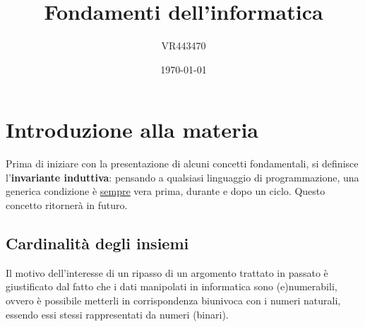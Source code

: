 \documentclass[a4paper]{article}
\begin{document}
	\author{VR443470}
	\title{Fondamenti dell'informatica}
	\date{\printdayoff\today}
	\maketitle
	
	\newpage
	
	\tableofcontents
	
	\newpage
	
	\section{Introduzione alla materia}
	
	Prima di iniziare con la presentazione di alcuni concetti fondamentali, si definisce l'\textbf{invariante induttiva}: pensando a qualsiasi linguaggio di programmazione, una generica condizione è \underline{sempre} vera prima, durante e dopo un ciclo. Questo concetto ritornerà in futuro.
	
	\subsection{Cardinalità degli insiemi}
	Il motivo dell'interesse di un ripasso di un argomento trattato in passato è giustificato dal fatto che i dati manipolati in informatica sono (e)numerabili, ovvero è possibile metterli in corrispondenza biunivoca con i numeri naturali, essendo essi stessi rappresentati da numeri (binari).
	
\end{document}
